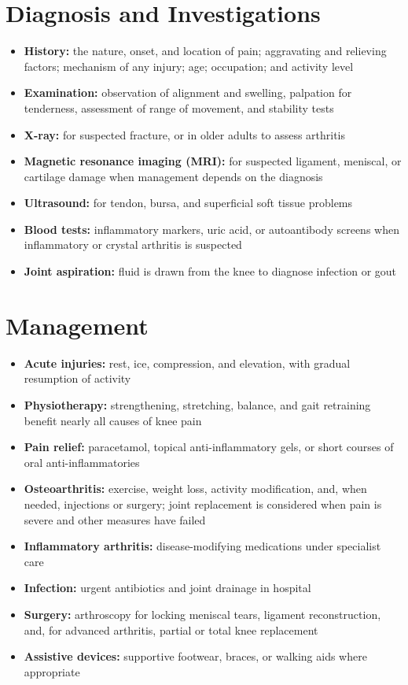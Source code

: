 \section*{Diagnosis and Investigations}
\begin{itemize}
    \item \textbf{History:} the nature, onset, and location of pain; aggravating and relieving factors; mechanism of any injury; age; occupation; and activity level
    \item \textbf{Examination:} observation of alignment and swelling, palpation for tenderness, assessment of range of movement, and stability tests
    \item \textbf{X-ray:} for suspected fracture, or in older adults to assess arthritis
    \item \textbf{Magnetic resonance imaging (MRI):} for suspected ligament, meniscal, or cartilage damage when management depends on the diagnosis
    \item \textbf{Ultrasound:} for tendon, bursa, and superficial soft tissue problems
    \item \textbf{Blood tests:} inflammatory markers, uric acid, or autoantibody screens when inflammatory or crystal arthritis is suspected
    \item \textbf{Joint aspiration:} fluid is drawn from the knee to diagnose infection or gout
\end{itemize}

\section*{Management}
\begin{itemize}
    \item \textbf{Acute injuries:} rest, ice, compression, and elevation, with gradual resumption of activity
    \item \textbf{Physiotherapy:} strengthening, stretching, balance, and gait retraining benefit nearly all causes of knee pain
    \item \textbf{Pain relief:} paracetamol, topical anti-inflammatory gels, or short courses of oral anti-inflammatories
    \item \textbf{Osteoarthritis:} exercise, weight loss, activity modification, and, when needed, injections or surgery; joint replacement is considered when pain is severe and other measures have failed
    \item \textbf{Inflammatory arthritis:} disease-modifying medications under specialist care
    \item \textbf{Infection:} urgent antibiotics and joint drainage in hospital
    \item \textbf{Surgery:} arthroscopy for locking meniscal tears, ligament reconstruction, and, for advanced arthritis, partial or total knee replacement
    \item \textbf{Assistive devices:} supportive footwear, braces, or walking aids where appropriate
\end{itemize}

